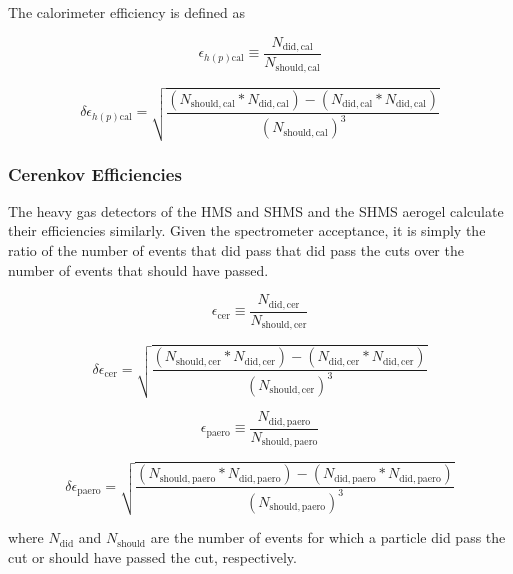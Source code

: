 \documentclass[
]{report}
\begin{document}
The calorimeter efficiency is defined as

\begin{equation} 
  \epsilon_{h(p)\mathrm{cal}}\equiv\frac{N_{\mathrm{did,cal}}}{N_{\mathrm{should,cal}}}
  \label{eq:cal_eff} 
\end{equation}

\begin{equation} 
 \delta\epsilon_{h(p)\mathrm{cal}}=\sqrt{\frac{(N_{\mathrm{should,cal}}*N_{\mathrm{did,cal}})-(N_{\mathrm{did,cal}}*N_{\mathrm{did,cal}})}{(N_{\mathrm{should,cal}})^3}}
  \label{eq:cal_eff_error} 
\end{equation}

\hypertarget{cerenkov-efficiencies}{%
\subsubsection{Cerenkov Efficiencies}\label{cerenkov-efficiencies}}

The heavy gas detectors of the HMS and SHMS and the SHMS aerogel
calculate their efficiencies similarly. Given the spectrometer
acceptance, it is simply the ratio of the number of events that did pass
that did pass the cuts over the number of events that should have
passed.

\begin{equation} 
  \epsilon_{\mathrm{cer}}\equiv\frac{N_{\mathrm{did,cer}}}{N_{\mathrm{should,cer}}}
  \label{eq:cer_eff} 
\end{equation}

\begin{equation} 
  \delta\epsilon_{\mathrm{cer}}=
\sqrt{\frac{(N_{\mathrm{should,cer}}*N_{\mathrm{did,cer}})-(N_{\mathrm{did,cer}}*N_{\mathrm{did,cer}})}{(N_{\mathrm{should,cer}})^3}}
  \label{eq:cer_eff_error} 
\end{equation}

\begin{equation} 
  \epsilon_{\mathrm{paero}}\equiv\frac{N_{\mathrm{did,paero}}}{N_{\mathrm{should,paero}}}
  \label{eq:paero_eff} 
\end{equation}

\begin{equation} 
  \delta\epsilon_{\mathrm{paero}}=
\sqrt{\frac{(N_{\mathrm{should,paero}}*N_{\mathrm{did,paero}})-(N_{\mathrm{did,paero}}*N_{\mathrm{did,paero}})}{(N_{\mathrm{should,paero}})^3}}
  \label{eq:paero_eff_error} 
\end{equation}

\noindent where \(N_{\mathrm{did}}\) and \(N_{\mathrm{should}}\) are the
number of events for which a particle did pass the cut or should have
passed the cut, respectively.
\end{document}
